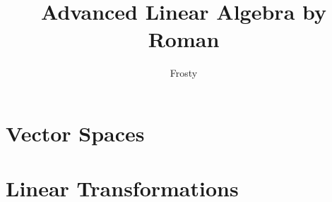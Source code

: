 \documentclass[10pt]{article}  %
\title{Advanced Linear Algebra by Roman}
\author{Frosty}
\begin{document}
\maketitle

\tableofcontents

\section{Vector Spaces}

\section{Linear Transformations}

\end{document}
